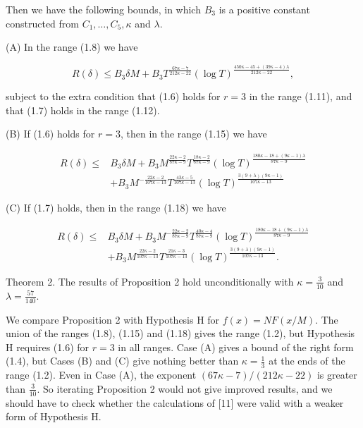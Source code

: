\documentclass[10pt]{article}
\begin{document}
Then we have the following bounds, in which $B_{3}$ is a positive constant constructed from $C_{1}, \ldots, C_{5}, \kappa$ and $\lambda$.

(A) In the range (1.8) we have

\begin{equation*}
R(\delta) \leqslant B_{3} \delta M+B_{3} T^{\frac{67 \kappa-7}{212 \kappa-22}}(\log T)^{\frac{450 \kappa-45+(39 \kappa-4) \lambda}{212 \kappa-22}}, \tag{1.22}
\end{equation*}


subject to the extra condition that (1.6) holds for $r=3$ in the range (1.11), and that (1.7) holds in the range (1.12).

(B) If (1.6) holds for $r=3$, then in the range (1.15) we have


\begin{align*}
R(\delta) \leqslant & B_{3} \delta M+B_{3} M^{\frac{22 \kappa-2}{87 \kappa-9}} T^{\frac{18 \kappa-2}{87 \kappa-9}}(\log T)^{\frac{180 \kappa-18+(9 \kappa-1) \lambda}{87 \kappa-9}} \\
& +B_{3} M^{-\frac{22 \kappa-2}{107 \kappa-13}} T^{\frac{43 \kappa-5}{107 \kappa-13}}(\log T)^{\frac{3(9+\lambda)(9 \kappa-1)}{107 \kappa-13}} \tag{1.23}
\end{align*}


(C) If (1.7) holds, then in the range (1.18) we have


\begin{align*}
R(\delta) \leqslant & B_{3} \delta M+B_{3} M^{-\frac{22 \kappa-2}{87 \kappa-9}} T^{\frac{40 \kappa-4}{87 \kappa-9}}(\log T)^{\frac{180 \kappa-18+(9 \kappa-1) \lambda}{87 \kappa-9}} \\
& +B_{3} M^{\frac{22 \kappa-2}{107 \kappa-13}} T^{\frac{21 \kappa-3}{107 \kappa-13}}(\log T)^{\frac{3(9+\lambda)(9 \kappa-1)}{107 \kappa-13}}. \tag{1.24}
\end{align*}


Theorem 2. The results of Proposition 2 hold unconditionally with $\kappa=\frac{3}{10}$ and $\lambda=\frac{57}{140}$.

We compare Proposition 2 with Hypothesis H for $f(x)=N F(x / M)$. The union of the ranges (1.8), (1.15) and (1.18) gives the range (1.2), but Hypothesis H requires (1.6) for $r=3$ in all ranges. Case (A) gives a bound of the right form (1.4), but Cases (B) and (C) give nothing better than $\kappa=\frac{1}{3}$ at the ends of the range (1.2). Even in Case (A), the exponent $(67 \kappa-7) /(212 \kappa-22)$ is greater than $\frac{3}{10}$. So iterating Proposition 2 would not give improved results, and we should have to check whether the calculations of [11] were valid with a weaker form of Hypothesis H.
\end{document}
